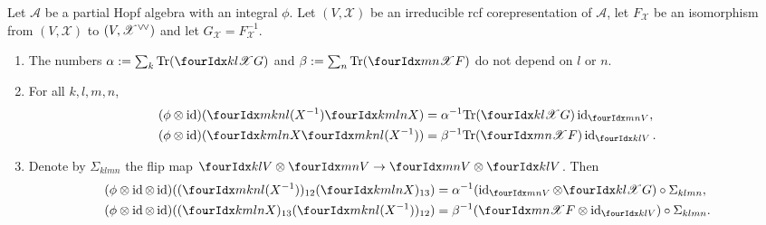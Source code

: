 \begin{Theorem} \label{thm:rep-orthogonality} Let $\mathcal{A}$ be a
  partial Hopf algebra with an integral $\phi$. Let $(V,\mathscr{X})$
  be an irreducible rcf corepresentation of $\mathscr{A}$, let
  $F_{\mathscr{X}}$ be an isomorphism from $(V,\mathscr{X})$ to
  $(V,\mathscr{X}^{\vee}\!{}^{\vee})$ and let
  $G_{\mathscr{X}}=F_{\mathscr{X}}^{-1}$.
  \begin{enumerate}
  \item The numbers $\alpha:=\sum_{k} \Tr (\Gr{G}{k}{l}{}{\mathscr{X}})$
    and $\beta:=\sum_{n} \Tr (\Gr{F}{m}{n}{}{\mathscr{X}})$ do not depend on $l$
    or $n$.
  \item  For all $k,l,m,n$,
    \begin{align*}
      (\phi \otimes \id)(\Gr{(X^{-1})}{m}{n}{k}{l}\Gr{X}{k}{l}{m}{n})
      &=\alpha^{-1}\Tr(\Gr{G}{k}{l}{}{\mathscr{X}})
      \id_{\Gru{V}{m}{n}}, \\
      (\phi \otimes \id)(\Gr{X}{k}{l}{m}{n}\Gr{(X^{-1})}{m}{n}{k}{l})
      &=\beta^{-1}\Tr(\Gr{F}{m}{n}{}{\mathscr{X}})
      \id_{\Gru{V}{k}{l}}.
    \end{align*}
  \item Denote by $\Sigma_{klmn}$ the flip map $\Gru{V}{k}{l}
    \otimes \Gru{V}{m}{n} \to \Gru{V}{m}{n}
    \otimes \Gru{V}{k}{l}$. Then
 \begin{align*}
   (\phi \otimes \id \otimes
   \id)((\Gr{(X^{-1})}{m}{n}{k}{l})_{12}(\Gr{X}{k}{l}{m}{n})_{13}) &=
   \alpha^{-1}
   (\id_{\Gru{V}{m}{n}} \otimes \Gr{G}{k}{l}{}{\mathscr{X}})
   \circ \Sigma_{klmn}, \\
   (\phi \otimes \id \otimes
   \id)((\Gr{X}{k}{l}{m}{n})_{13}(\Gr{(X^{-1})}{m}{n}{k}{l})_{12}) &= \beta^{-1} (\Gr{F}{m}{n}{}{\mathscr{X}}
   \otimes \id_{\Gru{V}{k}{l}}) \circ \Sigma_{klmn}.
 \end{align*}
\end{enumerate}
  \end{Theorem}
